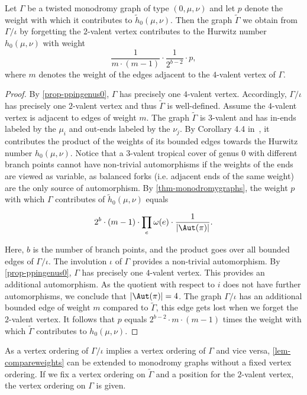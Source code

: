 \begin{lemma}\label{lem-compareweights}
Let $\Gamma$ be a twisted monodromy graph of type $(0,\mu,\nu)$ and let $p$ denote the weight with which it contributes to $\tilde{h}_0(\mu,\nu)$. 
Then the graph $\tilde{\Gamma}$ we obtain from $\Gamma/\iota$ by forgetting the $2$-valent vertex contributes to the Hurwitz number $h_0(\mu,\nu)$ with weight
$$\frac{1}{m\cdot(m-1)} \cdot \frac{1}{2^{b-2}}\cdot p,$$
where $m$ denotes the weight of the edges adjacent to the $4$-valent vertex of $\Gamma$.

\end{lemma}
\begin{proof}
By \cref{prop-ppingenus0}, $\Gamma$ has precisely one $4$-valent vertex. Accordingly, $\Gamma/\iota$ has precisely one $2$-valent vertex and thus $\tilde{\Gamma}$ is well-defined.
Assume the $4$-valent vertex is adjacent to edges of weight $m$.
The graph $\tilde{\Gamma}$ is $3$-valent and has in-ends labeled by the $\mu_i$ and out-ends labeled by the $\nu_j$. By Corollary 4.4 in~\cite{CJM10}, it contributes the product of the weights of its bounded edges towards the Hurwitz number $h_0(\mu,\nu)$. Notice that a $3$-valent tropical cover of genus $0$ with different branch points cannot have non-trivial automorphisms if the weights of the ends are viewed as variable, as balanced forks (i.e. adjacent ends of the same weight) are the only source of automorphism.
By \cref{thm-monodromygraphs}, the weight $p$ with which $\Gamma$ contributes of $\tilde{h}_0(\mu,\nu)$ equals 

$$2^{b}\cdot (m-1)\cdot\prod_e\omega(e)\cdot \frac{1}{|\Aut(\pi)|}.$$

Here, $b$ is the number of branch points, and the product goes over all bounded edges of $\Gamma/\iota$.
The involution $\iota$ of $\Gamma$ provides a non-trivial automorphism. By \cref{prop-ppingenus0}, $\Gamma$ has precisely one $4$-valent vertex. This provides an additional automorphism. As the quotient with respect to $i$ does not have further automorphisms, we conclude that $|\Aut(\pi)|=4$.
The graph $\Gamma/\iota$ has an additional bounded edge of weight $m$ compared to $\tilde{\Gamma}$, this edge gets lost when we forget the $2$-valent vertex.
It follows that $p$ equals
$2^{b-2}\cdot m \cdot (m-1)$ times the weight with which $\tilde{\Gamma}$ contributes to $h_0(\mu,\nu)$.
\end{proof}

\begin{rema}
As a vertex ordering of $\Gamma/\iota$ implies a vertex ordering of $\Gamma$ and vice versa, \cref{lem-compareweights} can be extended to monodromy graphs without a fixed vertex ordering. If we fix a vertex ordering on $\tilde{\Gamma}$ and a position for the $2$-valent vertex, the vertex ordering on $\Gamma$ is given.
\end{rema}

